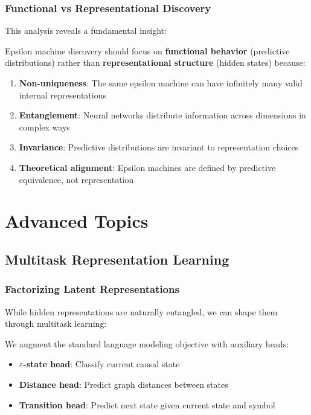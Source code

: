 \documentclass[11pt,a4paper]{report}
\newcommand{\epsmachine}{\varepsilon}
\theoremstyle{definition}
\begin{document}
\subsection{Functional vs Representational Discovery}

This analysis reveals a fundamental insight:

\begin{keyresult}
Epsilon machine discovery should focus on \textbf{functional behavior} (predictive distributions) rather than \textbf{representational structure} (hidden states) because:

\begin{enumerate}
    \item \textbf{Non-uniqueness}: The same epsilon machine can have infinitely many valid internal representations
    \item \textbf{Entanglement}: Neural networks distribute information across dimensions in complex ways
    \item \textbf{Invariance}: Predictive distributions are invariant to representation choices
    \item \textbf{Theoretical alignment}: Epsilon machines are defined by predictive equivalence, not representation
\end{enumerate}
\end{keyresult}

\chapter{Advanced Topics}
\label{ch:advanced}

\section{Multitask Representation Learning}
\label{sec:multitask}

\subsection{Factorizing Latent Representations}

While hidden representations are naturally entangled, we can shape them through multitask learning:

\begin{notebox}
We augment the standard language modeling objective with auxiliary heads:
\begin{itemize}
    \item \textbf{$\epsmachine$-state head}: Classify current causal state
    \item \textbf{Distance head}: Predict graph distances between states
    \item \textbf{Transition head}: Predict next state given current state and symbol
\end{itemize}
\end{notebox}
\end{document}
